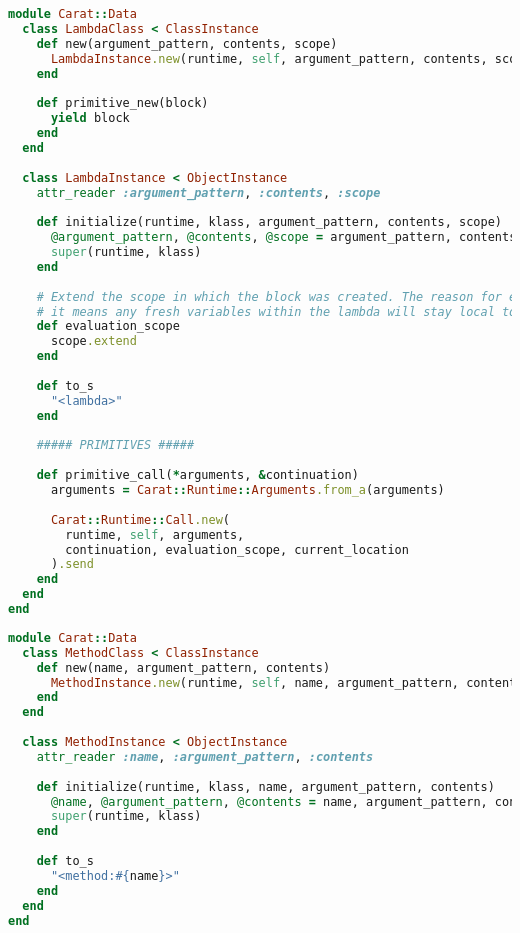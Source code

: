 \begin{lstlisting}[title={\small\ttfamily\bfseries data/lambda.rb},language=Ruby]
module Carat::Data
  class LambdaClass < ClassInstance
    def new(argument_pattern, contents, scope)
      LambdaInstance.new(runtime, self, argument_pattern, contents, scope)
    end
    
    def primitive_new(block)
      yield block
    end
  end
  
  class LambdaInstance < ObjectInstance
    attr_reader :argument_pattern, :contents, :scope
    
    def initialize(runtime, klass, argument_pattern, contents, scope)
      @argument_pattern, @contents, @scope = argument_pattern, contents, scope
      super(runtime, klass)
    end
    
    # Extend the scope in which the block was created. The reason for extending the scope is that 
    # it means any fresh variables within the lambda will stay local to the lambda.
    def evaluation_scope
      scope.extend
    end
    
    def to_s
      "<lambda>"
    end
    
    ##### PRIMITIVES #####
    
    def primitive_call(*arguments, &continuation)
      arguments = Carat::Runtime::Arguments.from_a(arguments)
      
      Carat::Runtime::Call.new(
        runtime, self, arguments,
        continuation, evaluation_scope, current_location
      ).send
    end
  end
end

\end{lstlisting}
\begin{lstlisting}[title={\small\ttfamily\bfseries data/method.rb},language=Ruby]
module Carat::Data
  class MethodClass < ClassInstance
    def new(name, argument_pattern, contents)
      MethodInstance.new(runtime, self, name, argument_pattern, contents)
    end
  end
  
  class MethodInstance < ObjectInstance
    attr_reader :name, :argument_pattern, :contents
    
    def initialize(runtime, klass, name, argument_pattern, contents)
      @name, @argument_pattern, @contents = name, argument_pattern, contents
      super(runtime, klass)
    end
    
    def to_s
      "<method:#{name}>"
    end
  end
end

\end{lstlisting}
